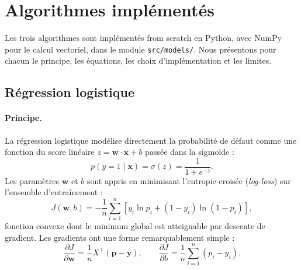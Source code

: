 
\section{Algorithmes implémentés}
\label{sec:algorithmes}

Les trois algorithmes sont implémentés from scratch en Python, avec NumPy pour
le calcul vectoriel, dans le module \texttt{src/models/}. Nous présentons pour
chacun le principe, les équations, les choix d'implémentation et les limites.

\subsection{Régression logistique}
\label{subsec:lr}

\paragraph{Principe.}
La régression logistique \cite{hosmer2000logistic} modélise directement la
probabilité de défaut comme une fonction du score linéaire
$z = \mathbf{w} \cdot \mathbf{x} + b$ passée dans la sigmoïde :
\[
  p(y = 1 \mid \mathbf{x}) = \sigma(z) = \frac{1}{1 + e^{-z}} .
\]
Les paramètres $\mathbf{w}$ et $b$ sont appris en minimisant l'entropie croisée
(\emph{log-loss}) sur l'ensemble d'entraînement :
\[
  J(\mathbf{w}, b) = -\frac{1}{n} \sum_{i=1}^{n}
    \left[ y_i \ln p_i + (1 - y_i) \ln (1 - p_i) \right],
\]
fonction convexe dont le minimum global est atteignable par descente de
gradient. Les gradients ont une forme remarquablement simple :
\[
  \frac{\partial J}{\partial \mathbf{w}} = \frac{1}{n} X^{\top}(\mathbf{p} - \mathbf{y}),
  \qquad
  \frac{\partial J}{\partial b} = \frac{1}{n} \sum_{i=1}^{n} (p_i - y_i).
\]

